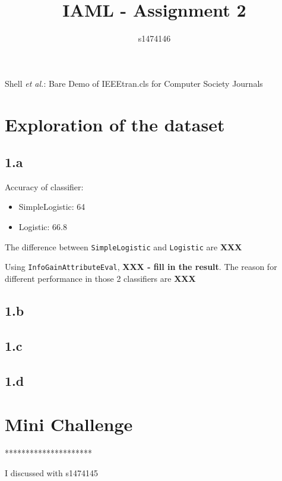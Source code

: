 \documentclass[12pt,journal,compsoc]{IEEEtran}
\begin{document}
%
\title{IAML - Assignment 2}
\author{s1474146}

%
{Shell \MakeLowercase{\textit{et al.}}: Bare Demo of IEEEtran.cls for Computer Society Journals}

\maketitle


\section{Exploration of the dataset}

\subsection*{1.a}
Accuracy of classifier:
\begin{itemize}
\item SimpleLogistic: 64%
\item Logistic: 66.8%
\end{itemize}
The difference between \texttt{SimpleLogistic} and \texttt{Logistic} are \textbf{XXX}

Using \texttt{InfoGainAttributeEval}, \textbf{XXX - fill in the result}. The reason for different performance in those 2 classifiers are \textbf{XXX}


\subsection*{1.b}

\subsection*{1.c}

\subsection*{1.d}

\section{Mini Challenge}

*********************

I discussed with s1474145
\end{document}
